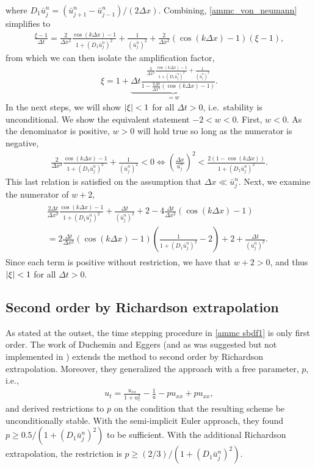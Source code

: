 where $D_1\bar u^n_j = (\bar u^n_{j+1} -  \bar u^n_{j-1})/(2\Delta x)$.
Combining, \eqref{ammc_von_neumann} simplifies to 
\begin{align}
        \frac{\xi - 1}{\Delta t} 
= \frac{2}{\Delta x^2}\frac{\cos(k\Delta x)-1}{1 +(
	D_1\bar u^n_j 
	)^2}
+ \frac{1}{(\bar u_j^n)^2}
+ \frac{2}{\Delta x^2}(\cos(k\Delta x)-1)(\xi-1),
\end{align}
from which we can then isolate the amplification factor,
\begin{align}
        \xi 
= 1+\underbrace{\Delta t \frac{\frac{2}{\Delta x^2}\frac{\cos(k\Delta x)-1}{1 +(
	D_1\bar u^n_j 
	)^2}
+ \frac{1}{(\bar u_j^n)^2}}{1-\frac{2\Delta t}{\Delta x^2}(\cos(k\Delta x)-1)}}_{=w}.
\end{align}
In the next steps, we will show $\left|\xi\right| < 1$ for all $\Delta t > 0$, i.e.\ stability is unconditional. We show the equivalent statement $-2 < w < 0$. First, $w<0$. As the denominator is positive, $w>0$ will hold true so long as the numerator is negative, 
\begin{align}
\frac{2}{\Delta x^2}\frac{\cos(k\Delta x)-1}{1 +(
	D_1\bar u^n_j 
	)^2}
+ \frac{1}{(\bar u_j^n)^2} < 0 
\iff 
\left(\frac{\Delta x}{\bar u^n_j} \right)^2 
< \frac{2(1-\cos(k\Delta x))}{1 + (D_1\bar u^n_j)^2}.
\end{align}
This last relation is satisfied on the assumption that $\Delta x \ll \bar u^n_j$.  Next, we examine the numerator of $w+2$,
\begin{align}
\begin{split}
  \frac{2\Delta t}{\Delta x^2}\frac{\cos(k\Delta x)-1}{1 + (D_1 \bar u^n_j)^2} 
  + \frac{\Delta t}{(\bar u^n_j)^2} + 2 - 4\frac{\Delta t}{\Delta x^2}(\cos(k\Delta x)-1) 
  \phantom{aaaa}
\\
= 2\frac{\Delta t}{\Delta x^2}(\cos(k\Delta x)-1)\left(
\frac{1}{1 + (D_1 \bar u^n_j)^2} - 2 \right)
+ 2 + \frac{\Delta t}{(\bar u^n_j)^2}.
\end{split}
\end{align}
Since each term is positive without restriction, we have that $w+2 > 0$, and thus $\left|\xi\right| < 1$ for all $\Delta t > 0$.

\subsection{Second order by Richardson extrapolation}
As stated at the outset, the time stepping procedure in \eqref{ammc sbdf1} is only first order. The work of Duchemin and Eggers \cite{duchemin2014explicit} (and as was suggested but not implemented in \cite{smereka2003semi}) extends the method to second order by Richardson extrapolation.  Moreover, they generalized the approach with a free parameter, $p$, i.e.,
\begin{align}
u_t = \frac{u_{xx}}{1 + u_x^2} - \frac{1}{u} - pu_{xx} + pu_{xx}, 
\label{ammc p}
\end{align}
and derived restrictions to $p$ on the condition that the resulting scheme be unconditionally stable. With the semi-implicit Euler approach, they found $p \geq0.5/(1 + (D_1 \bar u^n_j)^2)$ to be sufficient. With the additional Richardson extrapolation, the restriction is $p \geq (2/3)/(1 + (D_1 \bar u^n_j)^2)$.

